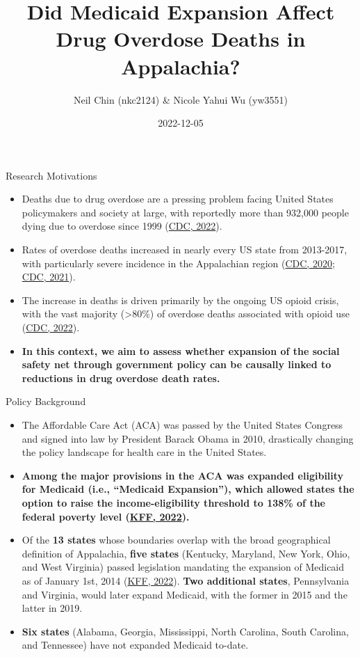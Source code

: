 \documentclass[
  ignorenonframetext,
]{beamer}
\title{Did Medicaid Expansion Affect Drug Overdose Deaths in
Appalachia?}
\author{Neil Chin (nkc2124) \& Nicole Yahui Wu (yw3551)}
\date{2022-12-05}
\providecommand{\tightlist}{%
  \setlength{\itemsep}{0pt}\setlength{\parskip}{0pt}}
\begin{document}
\frame{\titlepage}

\begin{frame}{Research Motivations}
\protect\hypertarget{research-motivations}{}
\begin{itemize}
\tightlist
\item
  Deaths due to drug overdose are a pressing problem facing United
  States policymakers and society at large, with reportedly more than
  932,000 people dying due to overdose since 1999
  (\href{https://www.cdc.gov/drugoverdose/deaths/index.html}{CDC,
  2022}).
\item
  Rates of overdose deaths increased in nearly every US state from
  2013-2017, with particularly severe incidence in the Appalachian
  region
  (\href{https://www.cdc.gov/drugoverdose/deaths/2013-2017-increase.html}{CDC,
  2020}; \href{https://www.cdc.gov/drugoverdose/deaths/2014.html}{CDC,
  2021}).
\item
  The increase in deaths is driven primarily by the ongoing US opioid
  crisis, with the vast majority (\textgreater80\%) of overdose deaths
  associated with opioid use
  (\href{https://www.cdc.gov/drugoverdose/deaths/index.html}{CDC,
  2022}).
\item
  \textbf{In this context, we aim to assess whether expansion of the
  social safety net through government policy can be causally linked to
  reductions in drug overdose death rates.}
\end{itemize}
\end{frame}

\begin{frame}{Policy Background}
\protect\hypertarget{policy-background}{}
\begin{itemize}
\tightlist
\item
  The Affordable Care Act (ACA) was passed by the United States Congress
  and signed into law by President Barack Obama in 2010, drastically
  changing the policy landscape for health care in the United States.
\item
  \textbf{Among the major provisions in the ACA was expanded eligibility
  for Medicaid (i.e., ``Medicaid Expansion''), which allowed states the
  option to raise the income-eligibility threshold to 138\% of the
  federal poverty level
  (\href{https://www.kff.org/medicaid/issue-brief/status-of-state-medicaid-expansion-decisions-interactive-map/}{KFF,
  2022}).}
\item
  Of the \textbf{13 states} whose boundaries overlap with the broad
  geographical definition of Appalachia, \textbf{five states} (Kentucky,
  Maryland, New York, Ohio, and West Virginia) passed legislation
  mandating the expansion of Medicaid as of January 1st, 2014
  (\href{https://www.kff.org/medicaid/issue-brief/status-of-state-medicaid-expansion-decisions-interactive-map/}{KFF,
  2022}). \textbf{Two additional states}, Pennsylvania and Virginia,
  would later expand Medicaid, with the former in 2015 and the latter in
  2019.
\item
  \textbf{Six states} (Alabama, Georgia, Mississippi, North Carolina,
  South Carolina, and Tennessee) have not expanded Medicaid to-date.
\end{itemize}
\end{frame}
\end{document}
